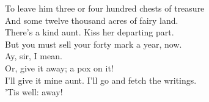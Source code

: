 \documentclass[a4paper,oneside,12pt]{memoir}
\begin{document}
\begin{drama*}
To leave him three or four hundred chests of treasure\\
And some twelve thousand acres of fairy land.\\
\subtlespeaks There's a kind aunt. Kiss her departing part.\\
But you must sell your forty mark a year, now.\\
\dapperspeaks Ay, sir, I mean.\\
\subtlespeaks {} Or, give it away; a pox on it!\\
\dapperspeaks I'll give it mine aunt. I'll go and fetch the writings.\\
\subtlespeaks 'Tis well: away!\\

\scene


\end{drama*}
\end{document}

